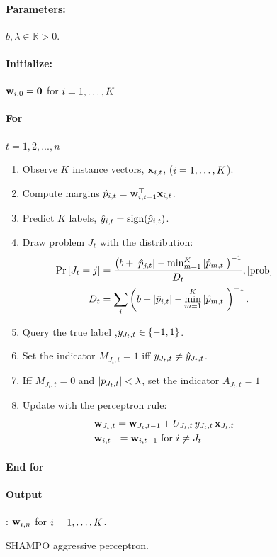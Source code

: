 \label{sec:FO_aggressive_alg}
\begin{figure}[h]
\paragraph{Parameters:}$b, \lambda \in\mathbb{R}>0$.
\paragraph{Initialize:} $\mathbf{w}_{i,0}={\boldsymbol{0}}$ for $i=1, \ldots , K$
\paragraph{For}  {$t=1,2, ..., n$} 
\begin{enumerate}
\nolineskips
\item Observe $K$ instance vectors, $\mathbf{x}_{i,t}$, ($i=1 , \ldots , K$).
\item Compute margins $\hat{p}_{i,t}={\mathbf{w}}^{\top}_{i,t-1} \mathbf{x}_{i,t}$.
\item Predict $K$ labels, $\hat{y}_{i,t}={\rm sign}(\hat{p}_{i,t})$.
\item Draw problem $J_t$  with the distribution:
\begin{align}
\pr{J_t=j} &=
\frac{\paren{b+\abs{\hat{p}_{j,t}}-\min_{m=1}^K\abs{\hat{p}_{m,t}}}^{-1}}{D_{t}}, \eqref{prob}\nonumber\\
D_t &=
\sum_i \paren{b+\abs{\hat{p}_{i,t}}-\min_{m=1}^K\abs{\hat{p}_{m,t}}}^{-1}. \nonumber
\end{align}
\item Query the true label ,$y_{J_t,t}\in\{-1,1\}$.
\item Set the indicator $M_{J_t, t}=1$ iff $y_{J_t,t} \neq \hat{y}_{J_t,t}$.
\item Iff $M_{J_t, t}=0$ and $\left\vert{p_{J_t,t}}\right\vert<\lambda$, set  the indicator $A_{J_t,t}=1$
\item Update with the perceptron rule:
\begin{align}
&\mathbf{w}_{J_t,t} = \mathbf{w}_{J_t,t-1}+U_{J_t,t} \, y_{J_t,t}\, \mathbf{x}_{J_t,t} \label{perc_update}\\
&\mathbf{w}_{i,t} ~~= \mathbf{w}_{i,t-1}  \textrm{ for } i \neq J_t \nonumber
\end{align}
\end{enumerate}
\paragraph{End for} 
\paragraph{Output}: $\mathbf{w}_{i,n}$ for $i=1 , \ldots , K$.
\caption{SHAMPO aggressive perceptron. \label{alg:SHAMPO_FO}}
\end{figure}        


